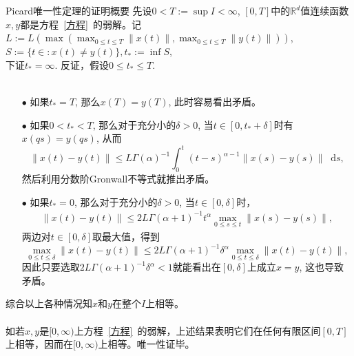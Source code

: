 \documentclass[aspectratio=16 9, 10pt, notheorems]{ctexbeamer}
\let\oldeqref\eqref
\renewcommand{\eqref}[1]{~\oldeqref{#1}~}
\newcommand{\mainEquation}{方程\eqref{方程}}
\newcommand{\differential}{\mathop{}\!\mathrm{d}}
\newcommand{\realset}{\mathbb{R}}
\begin{document}
\begin{frame}[allowframebreaks]{Picard唯一性定理的证明概要}
    先设$0<T:=\sup I<\infty$, $[0,T]$中的$\realset^d$值连续函数$x,y$都是\mainEquation 的弱解。记$L:=L\left(\max\left(\max_{0\leqslant t\leqslant T}\|x(t)\|,\right.\right.\allowbreak\left.\left.\max_{0\leqslant t\leqslant T}\|y(t)\|\right)\right)$, $S:=\{t\in \colon x(t)\neq y(t)\},t_*:=\inf S$, \\下证$t_*=\infty$. 反证，假设$0\leqslant t_*\leqslant T$.
    \\~\\
    \begin{itemize}%
        \item[$\bullet$] 如果$t_*=T$, 那么$x(T)=y(T)$, 此时容易看出矛盾。
        \item[$\bullet$] 如果$0<t_*<T$, 那么对于充分小的$\delta>0$, 当$t\in \left[0,t_*+\delta\right]$时有$x(qs)=y(qs)$, 从而
        \begin{equation*}
            \left\| x(t) - y(t) \right\| \leqslant {L}{\Gamma(\alpha)}^{-1} \int_0^t (t-s)^{\alpha-1} \|x(s)-y(s)\| \differential s,
        \end{equation*}
        然后利用分数阶Gronwall不等式就推出矛盾。
        \item[$\bullet$] 如果$t_*=0$, 那么对于充分小的$\delta>0$, 当$t\in \left[0,\delta\right]$时，
        \begin{align*}
            \left\| x(t) - y(t) \right\| \leqslant 2L\Gamma(\alpha+1)^{-1}t^\alpha \max_{0\leqslant s\leqslant t}\|x(s)-y(s)\|,
        \end{align*}
        两边对$t\in[0,\delta]$取最大值，得到
        \begin{equation*}
            \max_{0\leqslant t\leqslant \delta}\|x(t)-y(t)\|\leqslant 2L\Gamma(\alpha+1)^{-1}\delta^\alpha \max_{0\leqslant t\leqslant \delta}\|x(t)-y(t)\|,
        \end{equation*}
        因此只要选取$2L\Gamma(\alpha+1)^{-1}\delta^\alpha<1$就能看出在$[0,\delta]$上成立$x=y$, 这也导致矛盾。
    \end{itemize}
    综合以上各种情况知$x$和$y$在整个$I$上相等。
    \\~\\如若$x,y$是$[0,\infty)$上\mainEquation 的弱解，上述结果表明它们在任何有限区间$[0,T]$上相等，因而在$[0,\infty)$上相等。唯一性证毕。
\end{frame}
\end{document}
